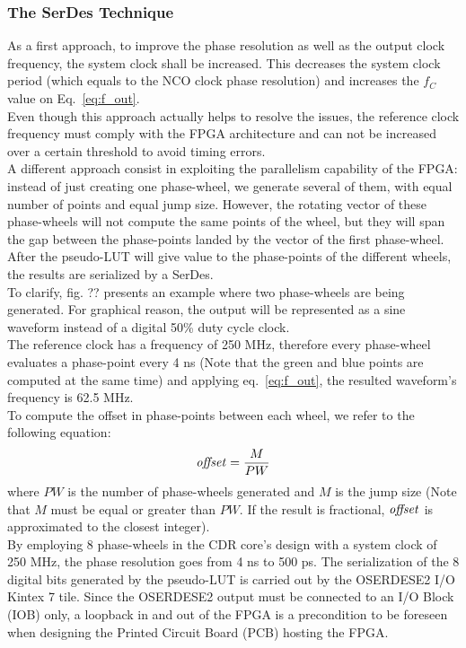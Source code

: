 \documentclass[12pt]{extarticle}
\renewcommand{\>}{\rangle} \renewcommand{\emptyset}{\varnothing}
\begin{document}
\subsubsection{The SerDes Technique}
As a first approach, to improve the phase resolution as well as the output clock
frequency, the system clock shall be increased. This decreases the system clock
period (which equals to the NCO clock phase resolution) and increases the $f_C$
value on Eq.~\ref{eq:f_out}.\\
Even though this approach actually helps to resolve the issues, the reference
clock frequency must comply with the FPGA architecture and can not be increased
over a certain threshold to avoid timing errors.\\
A different approach consist in exploiting the parallelism capability of the
FPGA: instead of just creating one phase-wheel, we generate several of them,
with equal number of points and equal jump size. However, the rotating vector of
these phase-wheels will not compute the same points of the wheel, but they will
span the gap between the phase-points landed by the vector of the first
phase-wheel. After the pseudo-LUT will give value to the phase-points of the
different
wheels, the results are serialized by a SerDes.\\
To clarify, fig. ?? presents an example where two phase-wheels are being
generated. For graphical reason, the output will be
represented as a sine waveform instead of a digital 50\% duty cycle clock.\\
The reference clock has a frequency of 250 MHz, therefore every phase-wheel
evaluates a phase-point every 4 ns (Note that the green and blue points are
computed at the same time) and applying eq.~\ref{eq:f_out}, the resulted
waveform's frequency is 62.5 MHz.\\
To compute the offset in phase-points between each wheel, we refer to the
following equation:
\begin{equation}
  \text{\textit{offset}} = \frac{M}{PW}
  \label{eq:offset}
\end{equation}
where $PW$ is the number of phase-wheels generated and $M$ is the jump size
(Note that $M$ must be equal or greater than $PW$. If the result is fractional,
$\text{\textit{offset}}$ is approximated to the closest integer).\\
By employing 8 phase-wheels in the CDR core's design with a system clock of 250
MHz, the phase resolution goes from 4 ns to 500 ps. The serialization of the 8
digital bits generated by the pseudo-LUT is carried out by the OSERDESE2 I/O
Kintex 7 tile. Since the OSERDESE2 output must be connected to an I/O Block
(IOB) only, a loopback in and out of the FPGA is a precondition to be foreseen
when designing the Printed Circuit
Board (PCB) hosting the FPGA.\\
\end{document}
